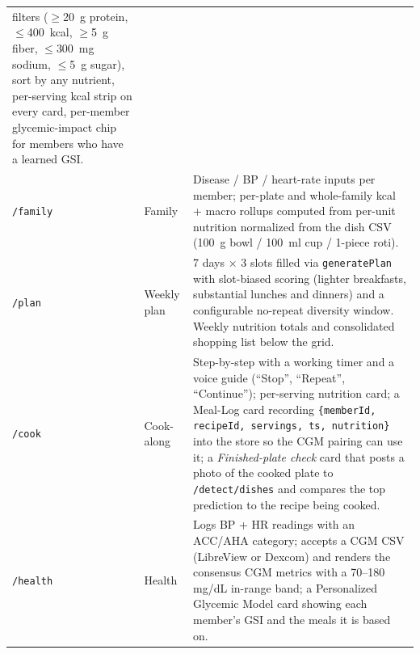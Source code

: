 \documentclass[journal]{IEEEtran}
\begin{document}
\begin{table}[!t]
\begin{tabularx}{\textwidth}{l l X}
                                 filters (\(\geq\)20~g protein,
                                 \(\leq\)400~kcal, \(\geq\)5~g fiber,
                                 \(\leq\)300~mg sodium, \(\leq\)5~g sugar),
                                 sort by any nutrient, per-serving kcal
                                 strip on every card, per-member
                                 glycemic-impact chip for members who
                                 have a learned GSI. \\
\texttt{/family}  & Family       & Disease / BP / heart-rate inputs per
                                 member; per-plate and whole-family
                                 kcal + macro rollups computed from
                                 per-unit nutrition normalized from the
                                 dish CSV (100~g bowl / 100~ml cup /
                                 1-piece roti). \\
\texttt{/plan}    & Weekly plan  & 7 days $\times$ 3 slots filled via
                                 \texttt{generatePlan} with slot-biased
                                 scoring (lighter breakfasts, substantial
                                 lunches and dinners) and a configurable
                                 no-repeat diversity window. Weekly
                                 nutrition totals and consolidated
                                 shopping list below the grid. \\
\texttt{/cook}    & Cook-along   & Step-by-step with a working timer and
                                 a voice guide (``Stop'', ``Repeat'',
                                 ``Continue''); per-serving nutrition
                                 card; a Meal-Log card recording
                                 \texttt{\{memberId, recipeId, servings,
                                 ts, nutrition\}} into the store so the
                                 CGM pairing can use it; a
                                 \textit{Finished-plate check} card
                                 that posts a photo of the cooked plate
                                 to \texttt{/detect/dishes} and
                                 compares the top prediction to the
                                 recipe being cooked. \\
\texttt{/health}  & Health       & Logs BP + HR readings with an ACC/AHA
                                 category; accepts a CGM CSV (LibreView
                                 or Dexcom) and renders the consensus
                                 CGM metrics with a 70--180 mg/dL
                                 in-range band; a Personalized Glycemic
                                 Model card showing each member's GSI
                                 and the meals it is based on. \\
\bottomrule
\end{tabularx}
\end{table}
\end{document}
